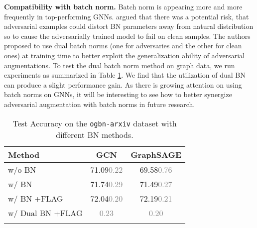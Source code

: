 \documentclass[11pt]{article}
\newcommand{\bftab}{\fontseries{b}\selectfont}
\begin{document}
{\bf Compatibility with batch norm.} Batch norm is appearing more and more frequently in top-performing GNNs. \citet{xie2020adversarial} argued that there was a potential risk, that adversarial examples could distort BN parameters away from natural distribution so to cause the adversarially trained model to fail on clean samples. The authors proposed to use dual batch norms (one for adversaries and the other for clean ones) at training time to better exploit the generalization ability of adversarial augmentations. To test the dual batch norm method on graph data, we run experiments as summarized in Table \ref{tab:bn}. We find that the utilization of dual BN can produce a slight performance gain. As there is growing attention on using batch norms on GNNs, it will be interesting to see how to better synergize adversarial augmentation with batch norms in future research. 
\begin{table}[t] \centering
\caption{Test Accuracy on the \texttt{ogbn-arxiv} dataset with different BN methods.}
\begin{tabular}{lcc}
\Xhline{2\arrayrulewidth}
Method &  GCN  & GraphSAGE \\
\hline\hline  
w/o BN & 71.09\textcolor{gray}{      {0.22}} & 69.58\textcolor{gray}{      {0.76}}  \\
w/ BN & 71.74\textcolor{gray}{      {0.29}}&71.49\textcolor{gray}{      {0.27}} \\
w/ BN +FLAG & 72.04\textcolor{gray}{      {0.20}}& 72.19\textcolor{gray}{      {0.21}}\\
w/ Dual BN +FLAG & \bftab72.11\textcolor{gray}{      {0.23}}& \bftab72.21\textcolor{gray}{      {0.20}}\\
\Xhline{2\arrayrulewidth}
\end{tabular}

\label{tab:bn}
\end{table} 
\end{document}
